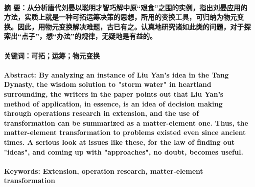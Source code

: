 \paragraph{\textbf{摘 要：}从分析唐代刘晏以聪明才智巧解中原“艰食”之围的实例，指出刘晏应用的方法，实质上就是一种可拓运筹决策的思想，所用的变换工具，可归纳为物元变换。因此，用物元变换解决难题，古已有之。认真地研究诸如此类的问题，对于探索出“点子”，想“办法”的规律，无疑地是有益的。}
\paragraph{\textbf{关键词：}可拓；运筹；物元变换}
\paragraph{\textbf{Abstract:} By analyzing an instance of Liu Yan’s idea in the Tang Dynasty, the wisdom solution to "storm water"  in heartland surrounding, the writers in the paper points out that Liu Yan's method of application, in essence, is an idea of decision making through operations research in extension, and the use of  transformation can be summarized as a matter-element one. Thus, the matter-element transformation to problems existed even since ancient times. A serious look at issues like these, for the law of finding out "ideas", and coming up with "approaches", no doubt, becomes useful.}
\paragraph{\textbf{Keywords:} Extension, operation research, matter-element transformation}
\paragraph{} 